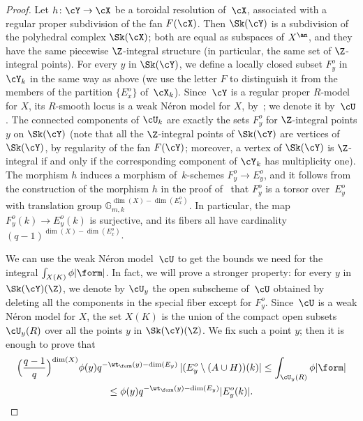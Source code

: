 \begin{proof}
Let $h\colon \cY\to \cX$ be a toroidal resolution of~$\cX$, associated with a regular proper subdivision of the fan $F(\cX)$.
Then $\Sk(\cY)$ is a subdivision of the polyhedral complex $\Sk(\cX)$; both are equal as subspaces of $X^{\an}$, and they have the same piecewise $\Z$-integral structure (in particular, the same set of $\Z$-integral points).
For every $y$ in $\Sk(\cY)$, we define a locally closed subset $F^o_y$ in $\cY_k$ in the same way as above (we use the letter $F$ to distinguish it from the members of the partition $\{E^o_x\}$ of~$\cX_k$).
Since~$\cY$ is a regular proper $R$\nobreakdash-model for $X$, its $R$\nobreakdash-smooth locus is a weak Néron model for $X$, by~\cite[3.1/2]{BLR}; we denote it by~$\cU$.
The connected components of $\cU_k$ are exactly the sets $F_y^o$ for $\Z$-integral points $y$ on $\Sk(\cY)$ (note that all the $\Z$-integral points of $\Sk(\cY)$ are vertices of $\Sk(\cY)$, by regularity of the fan $F(\cY)$; moreover, a vertex of $\Sk(\cY)$ is $\Z$-integral if and only if the corresponding component of $\cY_k$ has multiplicity one).
The morphism $h$ induces a morphism of~$k$-schemes $F^o_y\to E^o_y$, and it follows from the construction of the morphism $h$ in the
proof of~\cite[9.9]{kato} that $F^o_y$ is a torsor over~$E^o_y$ with translation group
$\mathbb{G}^{\dim(X)-\dim(E_x^o)}_{m,k}$. In particular, the map $F^o_y(k)\to E^o_y(k)$ is surjective, and its fibers all have cardinality $(q-1)^{\dim(X)-\dim(E_x^o)}$.

We can use the weak Néron model~$\cU$ to get the bounds we need for the integral $\int_{X(K)}\phi|\form|$.
In fact, we will prove a stronger property: for every $y$ in $\Sk(\cY)(\Z)$, we denote by $\cU_y$ the open subscheme of~$\cU$
obtained by deleting all the components in the special fiber except for $F^o_y$. Since~$\cU$ is a weak Néron model for $X$, the set $X(K)$ is the union of the compact open subsets $\cU_y(R)$ over all the points $y$ in $\Sk(\cY)(\Z)$. We fix such a point $y$; then it is enough to prove that
\begin{multline*}
\Bigl(\frac{q-1}{q}\Bigr)^{\dim(X)} \phi(y) q^{-\wt_{\form}(y)-\dim(E_y)}\,|(E_y^o\setminus (A\cup H))(k)| \leq \int_{\cU_y(R)}\phi|\form|
\\
\leq \phi(y)q^{-\wt_{\form}(y)-\dim(E_y)}|E_y^o(k)|.
\end{multline*}


\end{proof}
